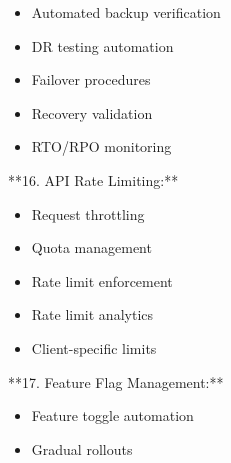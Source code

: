 \documentclass[11pt,a4paper]{article}
\begin{document}
\begin{itemize}
\item Automated backup verification
\end{itemize}

\begin{itemize}
\item DR testing automation
\end{itemize}

\begin{itemize}
\item Failover procedures
\end{itemize}

\begin{itemize}
\item Recovery validation
\end{itemize}

\begin{itemize}
\item RTO/RPO monitoring
\end{itemize}

**16. API Rate Limiting:**

\begin{itemize}
\item Request throttling
\end{itemize}

\begin{itemize}
\item Quota management
\end{itemize}

\begin{itemize}
\item Rate limit enforcement
\end{itemize}

\begin{itemize}
\item Rate limit analytics
\end{itemize}

\begin{itemize}
\item Client-specific limits
\end{itemize}

**17. Feature Flag Management:**

\begin{itemize}
\item Feature toggle automation
\end{itemize}

\begin{itemize}
\item Gradual rollouts
\end{itemize}
\end{document}

